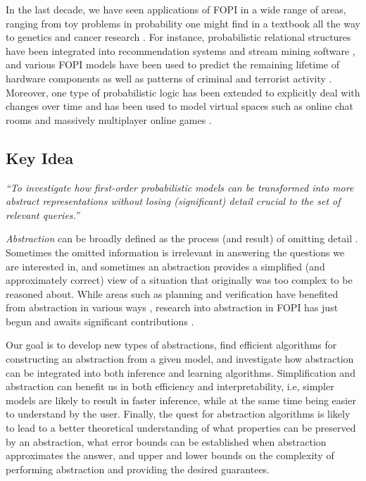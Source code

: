 \documentclass{article}
\begin{document}
In the last decade, we have seen applications of FOPI in a wide range of areas,
ranging from toy problems in probability one might find in a textbook
\cite{DBLP:conf/ijcai/DriesKDBR17} all the way to genetics
\cite{DBLP:journals/jcb/SakhanenkoG12} and cancer research
\cite{DBLP:conf/ilp/Corte-RealD017}. For instance, probabilistic relational
structures have been integrated into recommendation systems
\cite{DBLP:journals/corr/YangKAGN16} and stream mining software
\cite{DBLP:conf/icdm/ChandraSKTA14}, and various FOPI models have been used to
predict the remaining lifetime of hardware components
\cite{vlasselaer2012statistical} as well as patterns of criminal and terrorist
activity \cite{DBLP:conf/sdm/DelaneyFCWJ10}. Moreover, one type of probabilistic
logic has been extended to explicitly deal with changes over time and has been
used to model virtual spaces such as online chat rooms and massively multiplayer
online games \cite{DBLP:conf/pkdd/ThonLR08,DBLP:journals/ml/ThonLR11}.

\subsection{Key Idea}

\emph{``To investigate how first-order probabilistic models can be transformed
  into more abstract representations without losing (significant) detail
  crucial to the set of relevant queries.''}

\emph{Abstraction} can be broadly defined as the process (and result) of
omitting detail \cite{doi:10.1086/670300}. Sometimes the omitted information is
irrelevant in answering the questions we are interested in, and sometimes an
abstraction provides a simplified (and approximately correct) view of a
situation that originally was too complex to be reasoned about. While areas such
as planning and verification have benefited from abstraction in various ways
\cite{saitta2013abstraction}, research into abstraction in FOPI has just begun
and awaits significant contributions
\cite{DBLP:journals/corr/abs-1810-02434,DBLP:conf/icml/HoltzenBM18,DBLP:conf/uai/HoltzenMB17}.

Our goal is to develop new types of abstractions, find efficient
algorithms for constructing an abstraction from a given model, and investigate
how abstraction can be integrated into both inference and learning algorithms.
Simplification and abstraction can benefit us in both efficiency and
interpretability, i.e, simpler models are likely to result in faster inference,
while at the same time being easier to understand by the user. Finally, the
quest for abstraction algorithms is likely to lead to a better theoretical
understanding of what properties can be preserved by an abstraction, what error
bounds can be established when abstraction approximates the answer, and upper
and lower bounds on the complexity of performing abstraction and providing the
desired guarantees.
\end{document}
